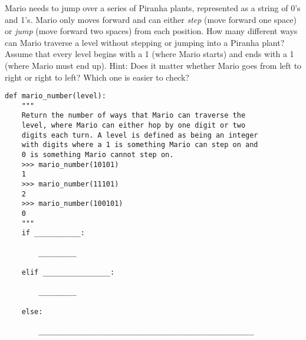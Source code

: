 \begin{blocksection}



\question Mario needs to jump over a series of Piranha plants, represented as a
string of 0's and 1's. Mario only moves forward and can
either \emph{step} (move forward one space) or \emph{jump} (move forward two
spaces) from each position. How many different ways can Mario traverse a level
without stepping or jumping into a Piranha plant? Assume that every level begins
with a 1 (where Mario starts) and ends with a 1 (where
Mario must end up).
\newline
Hint: Does it matter whether Mario goes from left to right or right to left? Which
one is easier to check?

\begin{lstlisting}
def mario_number(level):
    """
    Return the number of ways that Mario can traverse the
    level, where Mario can either hop by one digit or two
    digits each turn. A level is defined as being an integer
    with digits where a 1 is something Mario can step on and 
    0 is something Mario cannot step on. 
    >>> mario_number(10101)
    1
    >>> mario_number(11101)
    2   
    >>> mario_number(100101)
    0
    """
    if ___________:
		
        _________
				
    elif ________________:
		
        _________
				
    else:
		
        ___________________________________________________
\end{lstlisting}
\end{blocksection}

